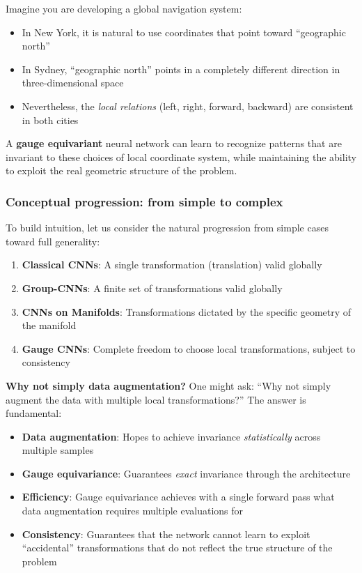 \begin{example}
Imagine you are developing a global navigation system:
\begin{itemize}
    \item In New York, it is natural to use coordinates that point toward ``geographic north''
    \item In Sydney, ``geographic north'' points in a completely different direction in three-dimensional space
    \item Nevertheless, the \textit{local relations} (left, right, forward, backward) are consistent in both cities
\end{itemize}

A \textbf{gauge equivariant} neural network can learn to recognize patterns that are invariant to these choices of local coordinate system, while maintaining the ability to exploit the real geometric structure of the problem.
\end{example}

\subsubsection{Conceptual progression: from simple to complex}

To build intuition, let us consider the natural progression from simple cases toward full generality:

\begin{enumerate}
    \item \textbf{Classical CNNs}: A single transformation (translation) valid globally
    \item \textbf{Group-CNNs}: A finite set of transformations valid globally
    \item \textbf{CNNs on Manifolds}: Transformations dictated by the specific geometry of the manifold
    \item \textbf{Gauge CNNs}: Complete freedom to choose local transformations, subject to consistency
\end{enumerate}

\textbf{Why not simply data augmentation?} One might ask: ``Why not simply augment the data with multiple local transformations?'' The answer is fundamental:

\begin{itemize}
    \item \textbf{Data augmentation}: Hopes to achieve invariance \textit{statistically} across multiple samples
    \item \textbf{Gauge equivariance}: Guarantees \textit{exact} invariance through the architecture
    \item \textbf{Efficiency}: Gauge equivariance achieves with a single forward pass what data augmentation requires multiple evaluations for
    \item \textbf{Consistency}: Guarantees that the network cannot learn to exploit ``accidental'' transformations that do not reflect the true structure of the problem
\end{itemize}

